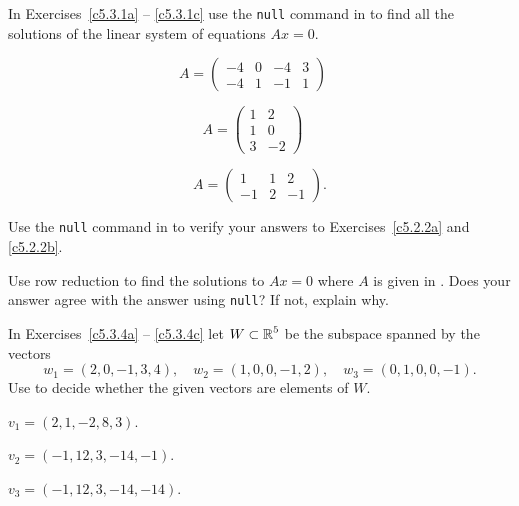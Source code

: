 \documentclass{ximera}
\begin{document}
\EXER

\CEXER

\noindent In Exercises~\ref{c5.3.1a} -- \ref{c5.3.1c} use the {\tt null}
command in \Matlab to find all the solutions of the linear system of
equations $Ax=0$.  
\begin{exercise} \label{c5.3.1a}
\begin{equation*} \label{e:BCDa}
          A=    \left(\begin{array}{cccc}
                -4 & 0 & -4 & 3\\
                -4 & 1 & -1 & 1
                \end{array}\right) \quad
\end{equation*}
\end{exercise}
\begin{exercise} \label{c5.3.1b}
\begin{equation*} \label{e:BCDb}
           A=    \left(\begin{array}{rr}
                1 & 2 \\
                1 & 0 \\
                3 & -2
                \end{array}\right) \quad
\end{equation*}
\end{exercise}
\begin{exercise} \label{c5.3.1c}
\begin{equation*} \label{e:BCDc}
          A=      \left(\begin{array}{rrr}
               1  &  1  &  2\\
              -1  &  2  & -1
                \end{array}\right).
\end{equation*}
\end{exercise}

\begin{exercise} \label{c5.3.2}
Use the {\tt null} command in \Matlab to verify your answers to
Exercises~\ref{c5.2.2a} and \ref{c5.2.2b}.
\end{exercise}

\begin{exercise} \label{c5.3.3}
Use row reduction to find the solutions to $Ax=0$ where $A$ is
given in .  Does your answer agree with the \Matlab
answer using {\tt null}?  If not, explain why.
\end{exercise}

\noindent In Exercises~\ref{c5.3.4a} -- \ref{c5.3.4c} let $W\subset\mbox{$\Bbb{R}$}^5$
be the subspace spanned by the vectors
\begin{equation*}
     w_1=(2,0,-1,3,4),\quad w_2=(1,0,0,-1,2),\quad w_3=(0,1,0,0,-1).
\end{equation*}
Use \Matlab to decide whether the given vectors are elements of $W$.
\begin{exercise} \label{c5.3.4a}
$v_1=(2,1,-2,8,3)$.
\end{exercise}
\begin{exercise} \label{c5.3.4b}
$v_2=(-1,12,3,-14,-1)$.
\end{exercise}
\begin{exercise} \label{c5.3.4c}
$v_3=(-1,12,3,-14,-14)$.
\end{exercise}
\end{document}
